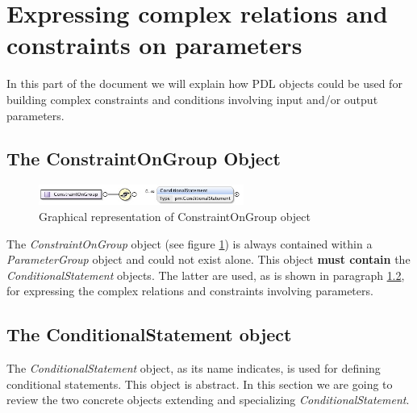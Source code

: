 \documentclass[a4paper,11pt] {ivoa}
\begin{document}
\section{Expressing complex relations and constraints on parameters}\label{complexRelations}
In this part of the document we will explain how PDL objects could be used for building complex
constraints and conditions involving input and/or output parameters.

\subsection{The ConstraintOnGroup Object}\label{par-ConstraintsOnGroup}
\begin{figure}[htbp]
\begin{center}
\includegraphics[width=0.6\textwidth]{pictures/ConstraintOnGroup.jpg} 
\caption{Graphical representation of ConstraintOnGroup object}
\label{Pic-ConstraintOnGroup}
\end{center}
\end{figure}

The {\it  ConstraintOnGroup} object (see figure \ref{Pic-ConstraintOnGroup}) is always contained within a {\it ParameterGroup} object and could not exist alone.
This object {\bf must contain} the {\it ConditionalStatement} objects. The latter are used, as is
shown in paragraph \ref{par-ConditionalStatement}, for expressing the complex relations and
constraints involving parameters.

\subsection{The ConditionalStatement object}\label{par-ConditionalStatement}
The {\it ConditionalStatement} object, as its name indicates, is used for defining conditional
statements. This object is abstract. In this section we are going to review the two concrete objects
extending and specializing  {\it ConditionalStatement}.
\end{document}
